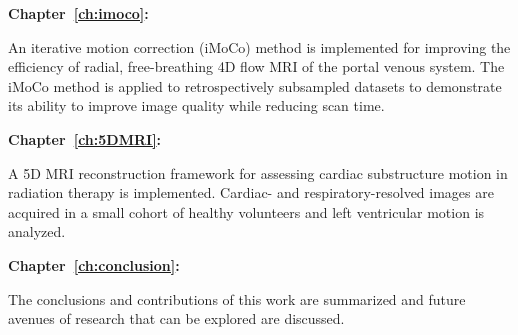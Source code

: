 \begin{description}
    \item \textbf{Chapter~\ref{ch:imoco}: }
   
    An iterative motion correction (iMoCo) method is implemented for improving the efficiency of radial, free-breathing 4D flow MRI of the portal venous system. The iMoCo method is applied to retrospectively subsampled datasets to demonstrate its ability to improve image quality while reducing scan time.

    \item \textbf{Chapter~\ref{ch:5DMRI}: } 
    
    A 5D MRI reconstruction framework for assessing cardiac substructure motion in radiation therapy is implemented. Cardiac- and respiratory-resolved images are acquired in a small cohort of healthy volunteers and left ventricular motion is analyzed.

    \item \textbf{Chapter~\ref{ch:conclusion}: }
    
    The conclusions and contributions of this work are summarized and future avenues of research that can be explored are discussed.

\end{description}


